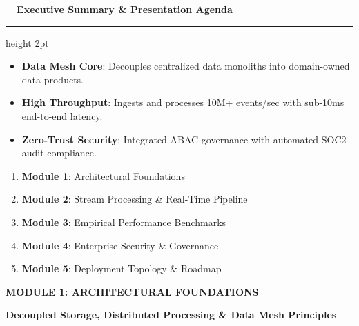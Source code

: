 \documentclass[landscape]{slides}
\newcommand{\slidetitle}[1]{%
  {\Large\bfseries\color{NavyDark} #1}\par\vspace{0.3em}%
  {\color{TealAccent}\hrule height 2pt}\vspace{0.6em}%
}
\newcommand{\sectionbanner}[2]{%
  \begin{center}
    \vspace*{1.2em}
    \begin{tcolorbox}[colback=NavyDark,colframe=TealAccent,arc=4pt,boxrule=1.5pt,center,width=0.9\textwidth]
      \centering
      \vspace{0.4em}
      {\Huge\bfseries\color{white} #1}\par\vspace{0.5em}
      {\large\color{TealAccent}\bfseries #2}
      \vspace{0.4em}
    \end{tcolorbox}
  \end{center}
}
\begin{document}
\begin{slide}
\slidetitle{\faList~~Executive Summary \& Presentation Agenda}

\begin{minipage}[t]{0.47\textwidth}
  \begin{tcolorbox}[colback=CardBg,colframe=TealAccent,title=\textbf{\faCheckCircle~~Executive Summary}]
    \small
    \begin{itemize}
      \item \textbf{Data Mesh Core}: Decouples centralized data monoliths into domain-owned data products.
      \item \textbf{High Throughput}: Ingests and processes 10M+ events/sec with sub-10ms end-to-end latency.
      \item \textbf{Zero-Trust Security}: Integrated ABAC governance with automated SOC2 audit compliance.
    \end{itemize}
  \end{tcolorbox}
\end{minipage}%
\hfill
\begin{minipage}[t]{0.49\textwidth}
  \begin{tcolorbox}[colback=CardBg,colframe=NavyDark,title=\textbf{\faProjectDiagram~~Presentation Agenda}]
    \small
    \begin{enumerate}
      \item \textbf{Module 1}: Architectural Foundations
      \item \textbf{Module 2}: Stream Processing \& Real-Time Pipeline
      \item \textbf{Module 3}: Empirical Performance Benchmarks
      \item \textbf{Module 4}: Enterprise Security \& Governance
      \item \textbf{Module 5}: Deployment Topology \& Roadmap
    \end{enumerate}
  \end{tcolorbox}
\end{minipage}
\end{slide}

\begin{slide}
\sectionbanner{MODULE 1: ARCHITECTURAL FOUNDATIONS}{Decoupled Storage, Distributed Processing \& Data Mesh Principles}
\end{slide}
\end{document}

